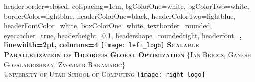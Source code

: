 \documentclass[landscape,a0paper,fontscale=0.32]{baposter} %
\begin{document}
\begin{poster}
{
headerborder=closed, %
colspacing=1em, %
bgColorOne=white, %
bgColorTwo=white, %
borderColor=lightblue, %
headerColorOne=black, %
headerColorTwo=lightblue, %
headerFontColor=white, %
boxColorOne=white, %
textborder=rounded,
eyecatcher=true, %
headerheight=0.1\textheight, %
headershape=roundedright,
headerfont=\Large\bf\textsc, %
linewidth=2pt, %
columns=4
}
{\texttt{[image: left\_logo]}} %
{\bf\textsc{Scalable Parallelization of Rigorous Global Optimization}\vspace{0.5em}} %
{\textsc{ {\Large \{Ian Briggs, Ganesh Gopalakrishnan, Zvonimir Rakamaric\}}\\
    \hspace{12pt} University of Utah School of Computing}} %
{\texttt{[image: right\_logo]}} %











\end{poster}
\end{document}
